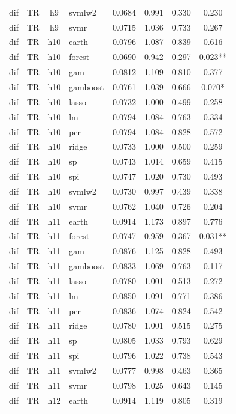 \begin{ThreePartTable}
\begin{longtable}[t]{llclcccc}
dif & TR & h9 & svmlw2 & 0.0684 & 0.991 & 0.330 & 0.230\\
dif & TR & h9 & svmr & 0.0715 & 1.036 & 0.733 & 0.267\\
\addlinespace
dif & TR & h10 & earth & 0.0796 & 1.087 & 0.839 & 0.616\\
dif & TR & h10 & forest & 0.0690 & 0.942 & 0.297 & 0.023**\\
dif & TR & h10 & gam & 0.0812 & 1.109 & 0.810 & 0.377\\
dif & TR & h10 & gamboost & 0.0761 & 1.039 & 0.666 & 0.070*\\
dif & TR & h10 & lasso & 0.0732 & 1.000 & 0.499 & 0.258\\
dif & TR & h10 & lm & 0.0794 & 1.084 & 0.763 & 0.334\\
dif & TR & h10 & pcr & 0.0794 & 1.084 & 0.828 & 0.572\\
dif & TR & h10 & ridge & 0.0733 & 1.000 & 0.500 & 0.259\\
dif & TR & h10 & sp & 0.0743 & 1.014 & 0.659 & 0.415\\
dif & TR & h10 & spi & 0.0747 & 1.020 & 0.730 & 0.493\\
dif & TR & h10 & svmlw2 & 0.0730 & 0.997 & 0.439 & 0.338\\
dif & TR & h10 & svmr & 0.0762 & 1.040 & 0.726 & 0.204\\
\addlinespace
dif & TR & h11 & earth & 0.0914 & 1.173 & 0.897 & 0.776\\
dif & TR & h11 & forest & 0.0747 & 0.959 & 0.367 & 0.031**\\
dif & TR & h11 & gam & 0.0876 & 1.125 & 0.828 & 0.493\\
dif & TR & h11 & gamboost & 0.0833 & 1.069 & 0.763 & 0.117\\
dif & TR & h11 & lasso & 0.0780 & 1.001 & 0.513 & 0.272\\
dif & TR & h11 & lm & 0.0850 & 1.091 & 0.771 & 0.386\\
dif & TR & h11 & pcr & 0.0836 & 1.074 & 0.824 & 0.542\\
dif & TR & h11 & ridge & 0.0780 & 1.001 & 0.515 & 0.275\\
dif & TR & h11 & sp & 0.0805 & 1.033 & 0.793 & 0.629\\
dif & TR & h11 & spi & 0.0796 & 1.022 & 0.738 & 0.543\\
dif & TR & h11 & svmlw2 & 0.0777 & 0.998 & 0.463 & 0.365\\
dif & TR & h11 & svmr & 0.0798 & 1.025 & 0.643 & 0.145\\
\addlinespace
dif & TR & h12 & earth & 0.0914 & 1.119 & 0.805 & 0.319\\

\end{longtable}
\end{ThreePartTable}

